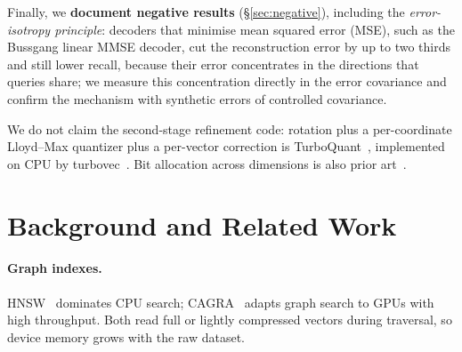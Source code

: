 \documentclass[fleqn,10pt]{wlscirep}
\begin{document}
Finally, we \textbf{document negative results} (\S\ref{sec:negative}), including the \emph{error-isotropy principle}: decoders that minimise mean squared error (MSE), such as the Bussgang linear MMSE decoder, cut the reconstruction error by up to two thirds and still lower recall, because their error concentrates in the directions that queries share; we measure this concentration directly in the error covariance and confirm the mechanism with synthetic errors of controlled covariance.

We do not claim the second-stage refinement code: rotation plus a per-coordinate Lloyd--Max quantizer plus a per-vector correction is TurboQuant~\cite{zandieh2025turboquant}, implemented on CPU by turbovec~\cite{turbovec}. Bit allocation across dimensions is also prior art~\cite{saq2025,monavec2026,beyonduniform2026}.

\section{Background and Related Work}\label{sec:related}
\paragraph{Graph indexes.} HNSW~\cite{malkov2020hnsw} dominates CPU search; CAGRA~\cite{ootomo2024cagra} adapts graph search to GPUs with high throughput. Both read full or lightly compressed vectors during traversal, so device memory grows with the raw dataset.
\end{document}
